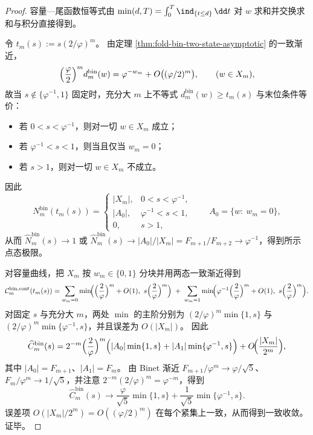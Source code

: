 \begin{proof}
容量—尾函数恒等式由 \(\min(d,T)=\int_0^T\ind_{\{t\le d\}}\,\dd t\) 对 \(w\) 求和并交换求和与积分直接得到。
\par
令 \(t_m(s):=s(2/\varphi)^m\)。
由定理 \ref{thm:fold-bin-two-state-asymptotic} 的一致渐近，
\[
\Bigl(\frac{\varphi}{2}\Bigr)^m d^{\mathrm{bin}}_m(w)=\varphi^{-w_m}+O\bigl((\varphi/2)^m\bigr),
\qquad (w\in X_m),
\]
故当 \(s\notin\{\varphi^{-1},1\}\) 固定时，充分大 \(m\) 上不等式
\(
d^{\mathrm{bin}}_m(w)\ge t_m(s)
\)
与末位条件等价：
\begin{itemize}
  \item 若 \(0<s<\varphi^{-1}\)，则对一切 \(w\in X_m\) 成立；
  \item 若 \(\varphi^{-1}<s<1\)，则当且仅当 \(w_m=0\)；
  \item 若 \(s>1\)，则对一切 \(w\in X_m\) 不成立。
\end{itemize}
因此
\[
N^{\mathrm{bin}}_m(t_m(s))
=
\begin{cases}
|X_m|,& 0<s<\varphi^{-1},\\
|A_0|,& \varphi^{-1}<s<1,\\
0,& s>1,
\end{cases}
\qquad A_0=\{w:\ w_m=0\},
\]
从而
\(
\widehat N^{\mathrm{bin}}_m(s)\to 1
\)
或
\(
\widehat N^{\mathrm{bin}}_m(s)\to |A_0|/|X_m|=F_{m+1}/F_{m+2}\to \varphi^{-1}
\)，得到所示点态极限。
\par
对容量曲线，把 \(X_m\) 按 \(w_m\in\{0,1\}\) 分块并用两态一致渐近得到
\[
\mathcal{C}^{\mathrm{bin,cont}}_m(t_m(s))
=\sum_{w_m=0}\min\!\Bigl(\Bigl(\frac{2}{\varphi}\Bigr)^m+O(1),\ s\Bigl(\frac{2}{\varphi}\Bigr)^m\Bigr)
\;+\;
\sum_{w_m=1}\min\!\Bigl(\varphi^{-1}\Bigl(\frac{2}{\varphi}\Bigr)^m+O(1),\ s\Bigl(\frac{2}{\varphi}\Bigr)^m\Bigr).
\]
对固定 \(s\) 与充分大 \(m\)，两处 \(\min\) 的主阶分别为 \((2/\varphi)^m\min\{1,s\}\) 与 \((2/\varphi)^m\min\{\varphi^{-1},s\}\)，并且误差为 \(O(|X_m|)\)。
因此
\[
\widehat C^{\mathrm{bin}}_m(s)
=2^{-m}\Bigl(\frac{2}{\varphi}\Bigr)^m\Bigl(|A_0|\min\{1,s\}+|A_1|\min\{\varphi^{-1},s\}\Bigr)+O\!\Bigl(\frac{|X_m|}{2^m}\Bigr),
\]
其中 \(|A_0|=F_{m+1}\)、\(|A_1|=F_m\)。
由 Binet 渐近 \(F_{m+1}/\varphi^m\to \varphi/\sqrt5\)、\(F_m/\varphi^m\to 1/\sqrt5\)，并注意
\(
2^{-m}(2/\varphi)^m=\varphi^{-m}
\)，得到
\[
\widehat C^{\mathrm{bin}}_m(s)\to \frac{\varphi}{\sqrt5}\min\{1,s\}+\frac{1}{\sqrt5}\min\{\varphi^{-1},s\}.
\]
误差项 \(O(|X_m|/2^m)=O((\varphi/2)^m)\) 在每个紧集上一致，从而得到一致收敛。证毕。
\end{proof}

